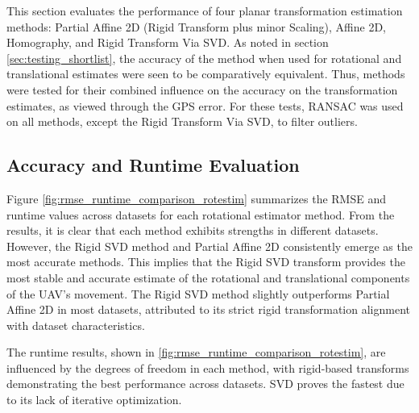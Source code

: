 This section evaluates the performance of four planar transformation estimation methods: Partial Affine 2D (Rigid Transform plus minor Scaling), Affine 2D, Homography, and Rigid Transform Via SVD. As noted in section \ref{sec:testing_shortlist}, the accuracy of the method when used for rotational and translational estimates were seen to be comparatively equivalent. Thus, methods were tested for their combined influence on the accuracy on the transformation estimates, as viewed through the GPS error. For these tests, RANSAC was used on all methods, except the Rigid Transform Via SVD, to filter outliers.

\subsection{Accuracy and Runtime Evaluation}

Figure \ref{fig:rmse_runtime_comparison_rotestim} summarizes the RMSE and runtime values across datasets for each rotational estimator method. From the results, it is clear that each method exhibits strengths in different datasets. However, the Rigid SVD method and Partial Affine 2D consistently emerge as the most accurate methods. This implies that the Rigid SVD transform provides the most stable and accurate estimate of the rotational and translational components of the UAV's movement. The Rigid SVD method slightly outperforms Partial Affine 2D in most datasets, attributed to its strict rigid transformation alignment with dataset characteristics.

The runtime results, shown in \ref{fig:rmse_runtime_comparison_rotestim}, are influenced by the degrees of freedom in each method, with rigid-based transforms demonstrating the best performance across datasets. SVD proves the fastest due to its lack of iterative optimization.


